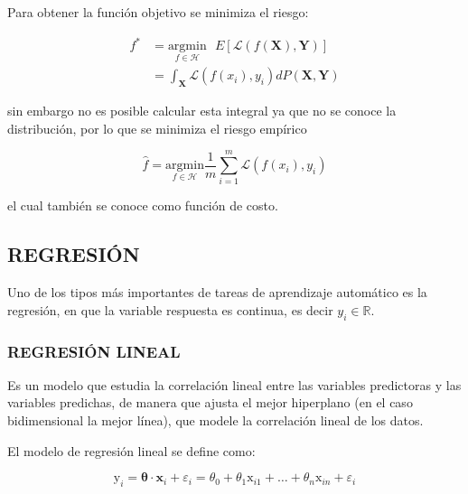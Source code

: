         Para obtener la función objetivo se minimiza el riesgo:
        
        \begin{equation}
        \begin{aligned}
            f^* &= \underset{f \in \mathcal{H}}{\text{argmin}} \text{ } E\left[\mathcal{L}(f(\mathbf{X}), \mathbf{Y})\right]\\[1.4em]
            &= \int_\mathbf{X} \mathcal{L}(f(x_i), y_i)dP(\mathbf{X}, \mathbf{Y})
        \end{aligned}
        \end{equation}
        
        \noindent sin embargo no es posible calcular esta integral ya que no se conoce la distribución, por lo que se minimiza el riesgo empírico
        
        \begin{equation}
            \hat{f} = \underset{f \in \mathcal{H}}{\text{argmin}} \frac{1}{m} \sum_{i=1}^m \mathcal{L}(f(x_i), y_i)
        \end{equation}
        
        \noindent el cual también se conoce como función de costo. \citep{10.5555/3360093}
        
    \subsection{REGRESIÓN}
        Uno de los tipos más importantes de tareas de aprendizaje automático es la regresión, en que la variable respuesta es continua, es decir $y_i \in \mathbb{R}$.
        \subsubsection{REGRESIÓN LINEAL}
        Es un modelo que estudia la correlación lineal entre las variables predictoras y las variables predichas, de manera que ajusta el mejor hiperplano (en el caso bidimensional la mejor línea), que modele la correlación lineal de los datos. \citep{gujarati2003basic}
        
        El modelo de regresión lineal se define como:
        
        \begin{equation}
            \mathrm{y}_i = \mathbf{\theta}\cdot\mathbf{x}_i + \varepsilon_i = \theta_0 + \theta_1\mathrm{x}_{i1} + \dots + \theta_n\mathrm{x}_{i n} + \varepsilon_i
        \end{equation}
        
